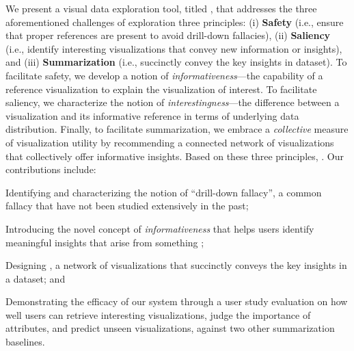  \par
 We present a visual data exploration tool, titled \system,
 that addresses the three aforementioned
 challenges of exploration 
 three principles:
 (i) \textbf{Safety}
 (i.e., ensure that proper
 references are present to
 avoid drill-down fallacies),
 (ii) \textbf{Saliency}
 (i.e., identify interesting visualizations
 that convey new information or insights),
 and (iii) \textbf{Summarization}
 (i.e., succinctly convey the key
 insights in  dataset).
 To facilitate safety, we develop a
 notion of \emph{informativeness}---the capability
 of a reference 
 visualization to explain the visualization of interest.
 To facilitate saliency,
 we characterize the notion of \emph{interestingness}---the
 difference between a visualization and
 its informative reference
 in terms of underlying data distribution.
 Finally, to facilitate summarization,
 we embrace a \emph{collective} measure of
 visualization utility by recommending a
 connected network of visualizations that collectively
 offer informative insights.
 Based on these three principles,
 .
 Our contributions include:
\begin{denselist}
\item Identifying and characterizing
the notion of ``drill-down fallacy'', a common fallacy
that have not been studied extensively in the past;
\item Introducing the novel concept of \emph{informativeness}
that helps users identify meaningful insights
that arise from something
;
\item Designing \system,
 a network of visualizations that succinctly conveys
 the key insights in a dataset; and
\item Demonstrating the efficacy of our system through a user study evaluation on how well users can retrieve interesting visualizations, judge the importance of attributes, and predict unseen visualizations, against two other summarization baselines.
\end{denselist}
